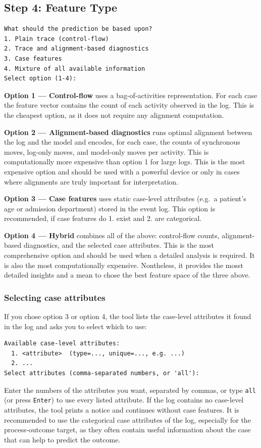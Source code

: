 \documentclass[12pt,a4paper]{article}
\begin{document}
\subsection{Step 4: Feature Type}
\begin{verbatim}
What should the prediction be based upon?
1. Plain trace (control-flow)
2. Trace and alignment-based diagnostics
3. Case features
4. Mixture of all available information
Select option (1-4):
\end{verbatim}

\textbf{Option 1 --- Control-flow} uses a bag-of-activities representation. For each case the feature vector contains the count of each activity observed in the log. This is the cheapest option, as it does not require any alignment computation.

\textbf{Option 2 --- Alignment-based diagnostics} runs optimal alignment between the log and the model and encodes, for each case, the counts of synchronous moves, log-only moves, and model-only moves per activity. This is computationally more expensive than option 1 for large logs. This is the most expensive option and should be used with a powerful device or only in cases where alignments are truly important for interpretation.

\textbf{Option 3 --- Case features} uses static case-level attributes (e.g.\ a patient's age or admission department) stored in the event log. This option is recommended, if case features do 1. exist and 2. are categorical.

\textbf{Option 4 --- Hybrid} combines all of the above: control-flow counts, alignment-based diagnostics, and the selected case attributes. This is the most comprehensive option and should be used when a detailed analysis is required. It is also the most computationally expensive. Nontheless, it provides the mosst detailed insights and a mean to chose the best feature space of the three above.

\subsubsection{Selecting case attributes}
If you chose option 3 or option 4, the tool lists the case-level attributes it found in the log and asks you to select which to use:
\begin{verbatim}
Available case-level attributes:
  1. <attribute>  (type=..., unique=..., e.g. ...)
  2. ...
Select attributes (comma-separated numbers, or 'all'):
\end{verbatim}
Enter the numbers of the attributes you want, separated by commas, or type \texttt{all} (or press \texttt{Enter}) to use every listed attribute. If the log contains no case-level attributes, the tool prints a notice and continues without case features. It is recommended to use the categorical case attributes of the log, especially for the process-outcome target, as they often contain useful information about the case that can help to predict the outcome.
\end{document}
